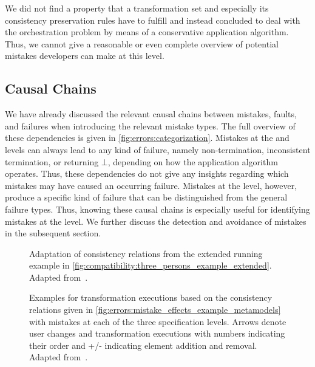We did not find a property that a transformation set and especially its consistency preservation rules have to fulfill and instead concluded to deal with the orchestration problem by means of a conservative application algorithm.
Thus, we cannot give a reasonable or even complete overview of potential mistakes developers can make at this level.


\subsection{Causal Chains}

We have already discussed the relevant causal chains between mistakes, faults, and failures when introducing the relevant mistake types.
The full overview of these dependencies is given in \autoref{fig:errors:categorization}.
Mistakes at the \levelnetworkrelation and \levelnetworkrule levels can always lead to any kind of failure, namely non-termination, inconsistent termination, or returning $\bot$, depending on how the application algorithm operates.
Thus, these dependencies do not give any insights regarding which mistakes may have caused an occurring failure.
Mistakes at the \leveltransformation level, however, produce a specific kind of failure that can be distinguished from the general failure types.
Thus, knowing these causal chains is especially useful for identifying mistakes at the \leveltransformation level.
We further discuss the detection and avoidance of mistakes in the subsequent section.

\begin{figure}
    \centering
    
    \caption[Adaptation of consistency relations from running example]{Adaptation of consistency relations from the extended running example in \autoref{fig:compatibility:three_persons_example_extended}. Adapted from~.}
    \label{fig:errors:mistake_effects_example_metamodels}
\end{figure}

\begin{figure}
    \centering
    
    \caption[Examples for mistakes at different knowledge levels]{Examples for transformation executions based on the consistency relations given in \autoref{fig:errors:mistake_effects_example_metamodels} with mistakes at each of the three specification levels. Arrows denote user changes and transformation executions with numbers indicating their order and +/- indicating element addition and removal. Adapted from~.}
    \label{fig:errors:mistake_effects_example_cases}
\end{figure}

